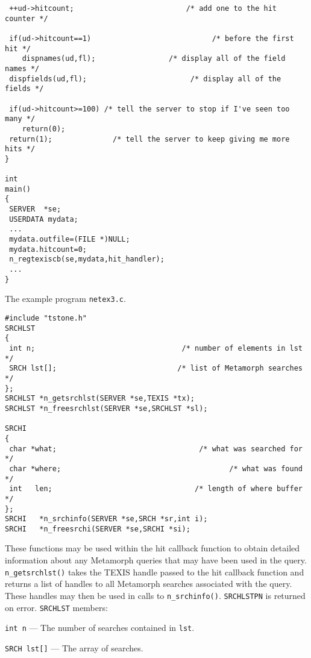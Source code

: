 \begin{verbatim}
 ++ud->hitcount;                          /* add one to the hit counter */

 if(ud->hitcount==1)                            /* before the first hit */
    dispnames(ud,fl);                 /* display all of the field names */
 dispfields(ud,fl);                        /* display all of the fields */

 if(ud->hitcount>=100) /* tell the server to stop if I've seen too many */
    return(0);
 return(1);              /* tell the server to keep giving me more hits */
}

int
main()
{
 SERVER  *se;
 USERDATA mydata;
 ...
 mydata.outfile=(FILE *)NULL;
 mydata.hitcount=0;
 n_regtexiscb(se,mydata,hit_handler);
 ...
}

\end{verbatim}

\SEE
The example program \verb`netex3.c`.


\SYNOPSIS
\begin{verbatim}
#include "tstone.h"
SRCHLST
{
 int n;                                  /* number of elements in lst */
 SRCH lst[];                            /* list of Metamorph searches */
};
SRCHLST *n_getsrchlst(SERVER *se,TEXIS *tx);
SRCHLST *n_freesrchlst(SERVER *se,SRCHLST *sl);

SRCHI
{
 char *what;                                 /* what was searched for */
 char *where;                                       /* what was found */
 int   len;                                 /* length of where buffer */
};
SRCHI   *n_srchinfo(SERVER *se,SRCH *sr,int i);
SRCHI   *n_freesrchi(SERVER *se,SRCHI *si);
\end{verbatim}

\DESCRIPTION

These functions may be used within the hit callback function to obtain
detailed information about any Metamorph queries that may have been used
in the query.  \verb`n_getsrchlst()` takes the TEXIS handle passed to
the hit callback function and returns a list of handles to all Metamorph
searches associated with the query.  These handles may then be used in
calls to \verb`n_srchinfo()`.  \verb`SRCHLSTPN` is returned on error.
\verb`SRCHLST` members:

\verb`int n` --- The number of searches contained in \verb`lst`.

\verb`SRCH lst[]` --- The array of searches.

